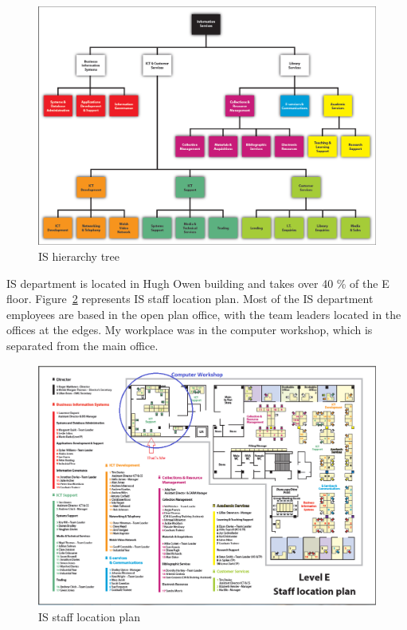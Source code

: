 \documentclass[10pt,a4paper,headinclude=true,twoside]{report}
\begin{document}
\begin{figure}[H]
\centering
\centerline{\includegraphics[scale=0.55]{./i-s-hierarchy-tree-march-2012}}
\caption{IS hierarchy tree \cite{ISHierarchyTree}}
\label{fig:i-s-hierarchy-tree-march-2012}
\end{figure}

IS department is located in Hugh Owen building and takes over 40 \% of the E floor.  Figure~\ref{fig:isfloorplan}  represents  IS staff location plan. Most of the IS department employees are based in the open plan office, with the team leaders located in the offices at the edges. My workplace was in the computer workshop, which is separated from the main office.

\begin{figure}[H]
\centering
\centerline{\includegraphics[scale=0.55]{./isfloorplan}}
\caption{IS staff location plan \cite{ISFloor}}
\label{fig:isfloorplan}
\end{figure}
\end{document}
